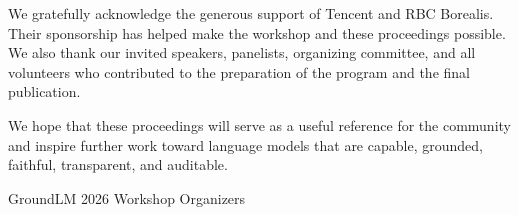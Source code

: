 We gratefully acknowledge the generous support of Tencent and RBC Borealis.
Their sponsorship has helped make the workshop and these proceedings possible.
We also thank our invited speakers, panelists, organizing committee, and all
volunteers who contributed to the preparation of the program and the final
publication.

We hope that these proceedings will serve as a useful reference for the
community and inspire further work toward language models that are capable,
grounded, faithful, transparent, and auditable.

\bigskip

GroundLM 2026 Workshop Organizers
